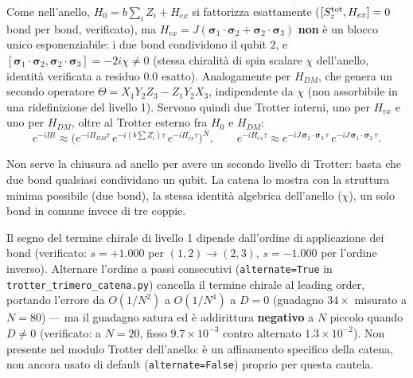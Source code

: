 \documentclass[11pt,a4paper]{article}
\begin{document}
Come nell'anello, $H_0=b\sum_iZ_i+H_{ex}$ si fattorizza esattamente ($[S_z^{\rm tot},H_{ex}]=0$
bond per bond, verificato), ma $H_{ex}=J(\boldsymbol\sigma_1\!\cdot\!\boldsymbol\sigma_2+
\boldsymbol\sigma_2\!\cdot\!\boldsymbol\sigma_3)$ \textbf{non} è un blocco unico esponenziabile:
i due bond condividono il qubit $2$, e
$[\boldsymbol\sigma_1\!\cdot\!\boldsymbol\sigma_2,\boldsymbol\sigma_2\!\cdot\!\boldsymbol\sigma_3]
=-2i\chi\neq0$ (stessa chiralità di spin scalare $\chi$ dell'anello, identità verificata a residuo
$0.0$ esatto). Analogamente per $H_{DM}$, che genera un secondo operatore
$\Theta=X_1Y_2Z_3-Z_1Y_2X_3$, indipendente da $\chi$ (non assorbibile in una ridefinizione del
livello 1). Servono quindi due Trotter interni, uno per $H_{ex}$ e uno per $H_{DM}$, oltre al
Trotter esterno fra $H_0$ e $H_{DM}$:
\begin{equation}
e^{-iHt}\approx\Big(e^{-iH_{DM}\tau}\,e^{-i(b\sum Z_i)\tau}\,e^{-iH_{ex}\tau}\Big)^N,
\qquad
e^{-iH_{ex}\tau}\approx e^{-iJ\,\boldsymbol\sigma_2\cdot\boldsymbol\sigma_3\,\tau}\,
e^{-iJ\,\boldsymbol\sigma_1\cdot\boldsymbol\sigma_2\,\tau}.
\end{equation}

\begin{ideabox}
Non serve la chiusura ad anello per avere un secondo livello di Trotter: basta che due bond
qualsiasi condividano un qubit. La catena lo mostra con la struttura minima possibile (due bond),
la stessa identità algebrica dell'anello ($\chi$), un solo bond in comune invece di tre coppie.
\end{ideabox}

\begin{noveltybox}
Il segno del termine chirale di livello 1 dipende dall'ordine di applicazione dei bond
(verificato: $s=+1.000$ per $(1,2)\to(2,3)$, $s=-1.000$ per l'ordine inverso). Alternare l'ordine
a passi consecutivi (\texttt{alternate=True} in \texttt{trotter\_trimero\_catena.py}) cancella il
termine chirale al leading order, portando l'errore da $O(1/N^2)$ a $O(1/N^4)$ a $D=0$ (guadagno
$34\times$ misurato a $N=80$) --- ma il guadagno satura ed è addirittura \textbf{negativo} a $N$
piccolo quando $D\neq0$ (verificato: a $N=20$, fisso $9.7\times10^{-3}$ contro alternato
$1.3\times10^{-2}$). Non presente nel modulo Trotter dell'anello: è un affinamento specifico della
catena, non ancora usato di default (\texttt{alternate=False}) proprio per questa cautela.
\end{noveltybox}
\end{document}
